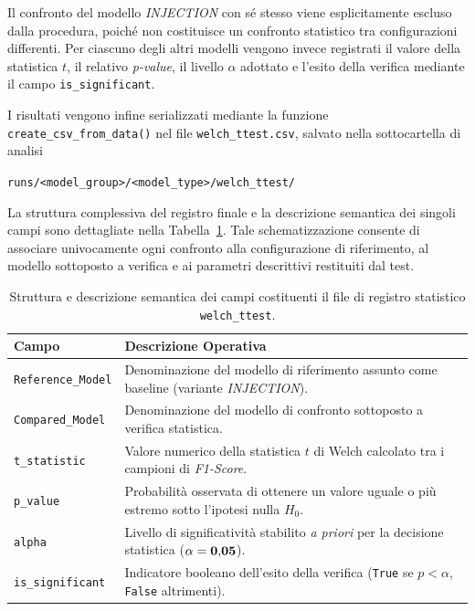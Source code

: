 Il confronto del modello \textit{INJECTION} con sé stesso viene esplicitamente escluso dalla procedura, poiché non costituisce un confronto statistico tra configurazioni differenti. 
Per ciascuno degli altri modelli vengono invece registrati il valore della statistica $t$, il relativo \textit{p-value}, il livello $\alpha$ adottato e l'esito della verifica mediante il campo \texttt{is\_significant}.

I risultati vengono infine serializzati mediante la funzione \texttt{create\_csv\_from\_data()} nel file \texttt{welch\_ttest.csv}, salvato nella sottocartella di analisi 

\begin{center}
    \texttt{runs/<model\_group>/<model\_type>/welch\_ttest/}
\end{center}

La struttura complessiva del registro finale e la descrizione semantica dei singoli campi sono dettagliate nella Tabella~\ref{tab:welch_csv_structure}. Tale schematizzazione consente di associare univocamente ogni confronto alla configurazione di riferimento, al modello sottoposto a verifica e ai parametri descrittivi restituiti dal test.

\begin{table}[H]
    \centering
    \small
    \caption{Struttura e descrizione semantica dei campi costituenti il file di registro statistico \texttt{welch\_ttest}.}
    \label{tab:welch_csv_structure}
    \begin{tabularx}{\textwidth}{l >{\raggedright\arraybackslash}X}
        \toprule
        \textbf{Campo} & \textbf{Descrizione Operativa} \\
        \midrule
        \texttt{Reference\_Model} & Denominazione del modello di riferimento assunto come baseline (variante \textit{INJECTION}). \\
        \texttt{Compared\_Model} & Denominazione del modello di confronto sottoposto a verifica statistica. \\
        \texttt{t\_statistic} & Valore numerico della statistica $t$ di Welch calcolato tra i campioni di \textit{F1-Score}. \\
        \texttt{p\_value} & Probabilità osservata di ottenere un valore uguale o più estremo sotto l'ipotesi nulla $H_0$. \\
        \texttt{alpha} & Livello di significatività stabilito \textit{a priori} per la decisione statistica ($\bf{\alpha = 0{,}05}$). \\
        \texttt{is\_significant} & Indicatore booleano dell'esito della verifica (\texttt{True} se $p < \alpha$, \texttt{False} altrimenti). \\
        \bottomrule
    \end{tabularx}
\end{table}

